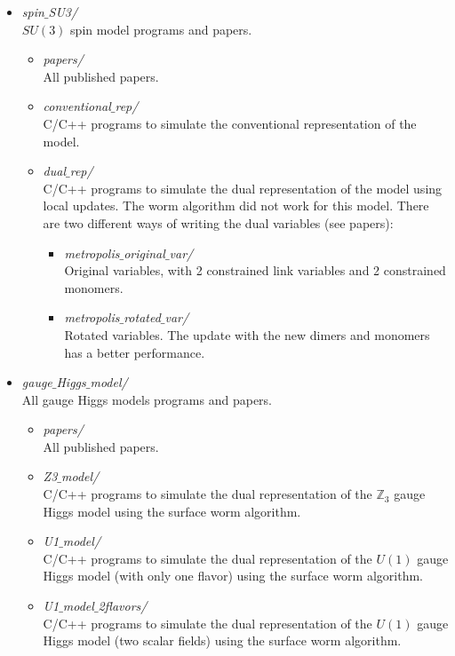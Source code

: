 \documentclass[a4paper,10pt]{report}
\begin{document}
\begin{itemize}[leftmargin=*]
 \item {\it spin$\_$SU3/}
 \\$SU(3)$ spin model programs and papers.
 \begin{itemize}[leftmargin=*]
  \item {\it papers/}
  \\All published papers.
  \item {\it conventional$\_$rep/}
  \\C/C++ programs to simulate the conventional
  representation of the model.
  \item {\it dual$\_$rep/}
  \\C/C++ programs to simulate the dual
  representation of the model using local updates.  
  The worm algorithm did not work for this model. There are
  two different ways of writing the dual variables (see papers):
  \begin{itemize}[leftmargin=*]
   \item {\it metropolis$\_$original$\_$var/}
   \\Original variables, with 2 constrained link variables 
   and 2 constrained monomers.
   \item {\it metropolis$\_$rotated$\_$var/}
   \\Rotated variables. The update with the new dimers and monomers has a
   better performance.
  \end{itemize}
  \end{itemize}

 \item {\it gauge$\_$Higgs$\_$model/}
 \\All gauge Higgs models programs and papers.
 \begin{itemize}[leftmargin=*]
  \item {\it papers/}
  \\All published papers.
  \item {\it Z3$\_$model/}
  \\C/C++ programs to simulate the dual representation of the 
  $\mathds{Z}_3$ gauge Higgs model using the surface worm algorithm.
  \item {\it U1$\_$model/}
  \\C/C++ programs to simulate the dual representation of the 
  $U(1)$ gauge Higgs model (with only one flavor) using the surface worm algorithm.
  \item {\it U1$\_$model$\_$2flavors/}
  \\C/C++ programs to simulate the dual representation of the 
  $U(1)$ gauge Higgs model (two scalar fields) using the surface worm algorithm.
 \end{itemize}

\end{itemize}
\end{document}

